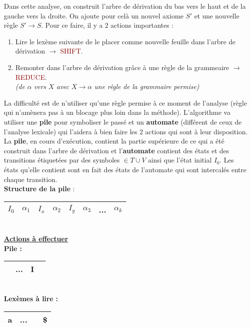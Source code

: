 \documentclass{article}
\newcommand{\red}[1]{\textcolor{darkred}{#1}}
\newcommand{\stitre}[1]{\noindent\textbf{\underline{#1}}}
\begin{document}
Dans cette analyse, on construit l'arbre de dérivation du bas vers le haut et de la gauche vers la droite. On ajoute pour celà un nouvel axiome $S'$ et une nouvelle règle
$S'\rightarrow S$. Pour ce faire, il y a 2 actions importantes : 
\begin{enumerate}
\item Lire le lexème suivante de le placer comme nouvelle feuille dans l'arbre de dérivation $\rightarrow$ \red{SHIFT}.
\item Remonter dans l'arbre de dérivation grâce à une règle de la grammeaire $\rightarrow$ \red{REDUCE}. \\\textit{(de $\alpha$ vers $X$ avec $X\rightarrow \alpha$ une 
règle de la grammaire permise)}
\end{enumerate}
La difficulté est de n'utiliser qu'une règle permise à ce moment de l'analyse (règle qui n'amènera pas à un blocage plus loin dans la méthode). L'algorithme va utiliser une 
\textbf{pile} pour symboliser le passé et un \textbf{automate} (différent de ceux de l'analyse lexicale) qui l'aidera à bien faire les 2 actions qui sont à leur disposition. La 
\textbf{pile}, en cours d'exécution, contient la partie supérieure de ce qui a été construit dans l'arbre de dérivation et l'\textbf{automate} contient des états et des transitions 
étiquetées par des symboles $\in T\cup V$ ainsi que l'état initial $I_0$. Les états qu'elle contient sont en fait des états de l'automate qui sont intercalés entre chaque transition.
\\ \textbf{Structure de la pile} : \begin{tabular}{|c|c|c|c|c|c|c|c|} \hline $I_0$ & $\alpha_1$ & $I_x$ & $\alpha_2$ & $I_y$ & $\alpha_3$ & ... & $\alpha_k$\\ 
\hline\end{tabular}  \\

\stitre{Actions à effectuer} \\

\textbf{Pile : }  \begin{tabular}{|c|c|c|c}\hline & ... & I & \\ \hline \end{tabular} \\
\textbf{Lexèmes à lire : } \begin{tabular}{|c|c|c|c|}\hline a & ... &  & \$ \\ \hline \end{tabular} \\
\end{document}

